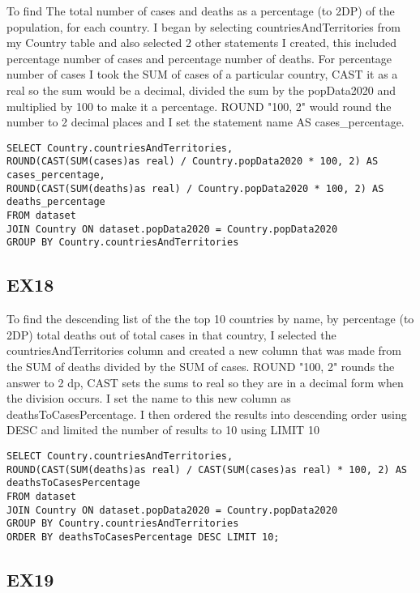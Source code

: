 \documentclass[]{article}
\begin{document}
To find The total number of cases and deaths as a percentage (to 2DP) of the population, for each country. I began by selecting countriesAndTerritories from my Country table and also selected 2 other statements
I created, this included percentage number of cases and percentage number of deaths. For percentage number of cases I took the SUM of cases of a particular country, CAST it as a real so the sum would be a decimal,
divided the sum by the popData2020 and multiplied by 100 to make it a percentage. ROUND "100, 2" would round the number to 2 decimal places and I set the statement name AS cases\_percentage.

\begin{lstlisting}
SELECT Country.countriesAndTerritories,
ROUND(CAST(SUM(cases)as real) / Country.popData2020 * 100, 2) AS cases_percentage,
ROUND(CAST(SUM(deaths)as real) / Country.popData2020 * 100, 2) AS deaths_percentage
FROM dataset
JOIN Country ON dataset.popData2020 = Country.popData2020
GROUP BY Country.countriesAndTerritories
\end{lstlisting}

\subsection{EX18}

To find the descending list of the the top 10 countries by name, by percentage (to 2DP) total deaths out of total cases in that country, I selected the countriesAndTerritories column and created a new column that was made from the SUM of deaths divided by the SUM of cases. ROUND "100, 2" rounds the answer to 2 dp,
CAST sets the sums to real so they are in a decimal form when the division occurs. I set the name to this new column as deathsToCasesPercentage. I then ordered the results into descending order using DESC and limited the number of results to 10 using LIMIT 10 

\begin{lstlisting}
SELECT Country.countriesAndTerritories,
ROUND(CAST(SUM(deaths)as real) / CAST(SUM(cases)as real) * 100, 2) AS deathsToCasesPercentage
FROM dataset
JOIN Country ON dataset.popData2020 = Country.popData2020
GROUP BY Country.countriesAndTerritories
ORDER BY deathsToCasesPercentage DESC LIMIT 10;
\end{lstlisting}

\subsection{EX19}
\end{document}
